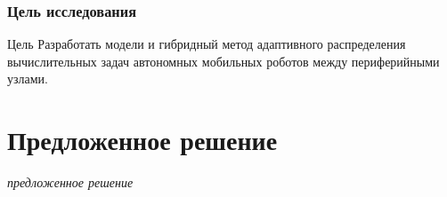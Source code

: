 \begin{frame}
	\frametitle{Цель исследования}
	\small
	\begin{block}{Цель}
		Разработать модели и гибридный метод адаптивного распределения вычислительных задач автономных мобильных роботов между периферийными узлами.
	\end{block}
	\medskip
	\begin{center}
	\end{center}
\end{frame}

\section{Предложенное решение}

\begin{frame}
    \begin{center}
        \begin{center}
	\textit{предложенное решение}
        \end{center}
    \end{center}
\end{frame}

